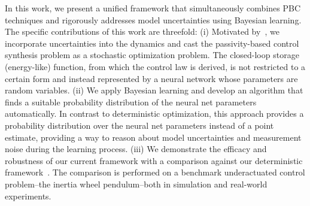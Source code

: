     


In this work, we present a unified framework that simultaneously combines PBC
techniques and rigorously addresses model uncertainties using Bayesian learning.
%
The specific contributions of this work are threefold: (i)
Motivated by~\cite{sirichotiyakul2020data}, we incorporate uncertainties into
the dynamics and cast the passivity-based control synthesis problem as a
stochastic optimization problem.
%
The closed-loop storage (energy-like) function, from which the control law is
derived, is not restricted to a certain form and instead represented by a neural
network whose parameters are random variables.
%
%
(ii) We apply Bayesian learning and develop an algorithm that finds
a suitable probability distribution of the neural net parameters automatically.
%
In contrast to deterministic optimization, this approach provides a probability
distribution over the neural net parameters instead of a point estimate,
providing a way to reason about model uncertainties and measurement noise during
the learning process.
%
(iii) We demonstrate the efficacy and robustness of our current framework with a
comparison against our deterministic
framework~\cite{sirichotiyakul2020data}. The comparison is performed on a
benchmark underactuated control problem--the inertia wheel pendulum--both in
simulation and real-world experiments. 



